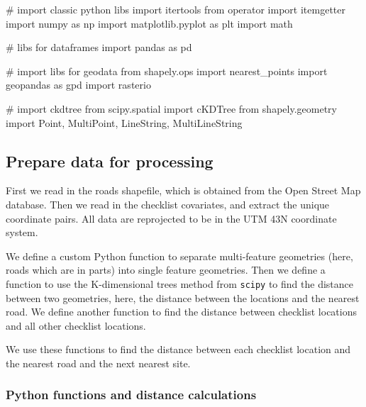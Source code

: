 \documentclass[]{article}
\newenvironment{Shaded}{}{}
\newcommand{\CommentTok}[1]{\textcolor[rgb]{0.00,0.50,0.00}{#1}}
\newcommand{\ImportTok}[1]{#1}
\newcommand{\NormalTok}[1]{#1}
\begin{document}
\begin{Shaded}
\begin{Highlighting}[numbers=left,,]
\CommentTok{# import classic python libs}
\ImportTok{import}\NormalTok{ itertools}
\ImportTok{from}\NormalTok{ operator }\ImportTok{import}\NormalTok{ itemgetter}
\ImportTok{import}\NormalTok{ numpy }\ImportTok{as}\NormalTok{ np}
\ImportTok{import}\NormalTok{ matplotlib.pyplot }\ImportTok{as}\NormalTok{ plt}
\ImportTok{import}\NormalTok{ math}

\CommentTok{# libs for dataframes}
\ImportTok{import}\NormalTok{ pandas }\ImportTok{as}\NormalTok{ pd}

\CommentTok{# import libs for geodata}
\ImportTok{from}\NormalTok{ shapely.ops }\ImportTok{import}\NormalTok{ nearest_points}
\ImportTok{import}\NormalTok{ geopandas }\ImportTok{as}\NormalTok{ gpd}
\ImportTok{import}\NormalTok{ rasterio}

\CommentTok{# import ckdtree}
\ImportTok{from}\NormalTok{ scipy.spatial }\ImportTok{import}\NormalTok{ cKDTree}
\ImportTok{from}\NormalTok{ shapely.geometry }\ImportTok{import}\NormalTok{ Point, MultiPoint, LineString, MultiLineString}
\end{Highlighting}
\end{Shaded}

\hypertarget{prepare-data-for-processing}{%
\subsection{Prepare data for processing}\label{prepare-data-for-processing}}

First we read in the roads shapefile, which is obtained from the Open Street Map database.
Then we read in the checklist covariates, and extract the unique coordinate pairs.
All data are reprojected to be in the UTM 43N coordinate system.

We define a custom Python function to separate multi-feature geometries (here, roads which are in parts) into single feature geometries.
Then we define a function to use the K-dimensional trees method from \texttt{scipy} to find the distance between two geometries, here, the distance between the locations and the nearest road.
We define another function to find the distance between checklist locations and all other checklist locations.

We use these functions to find the distance between each checklist location and the nearest road and the next nearest site.

\hypertarget{python-functions-and-distance-calculations}{%
\subsubsection{Python functions and distance calculations}\label{python-functions-and-distance-calculations}}
\end{document}
